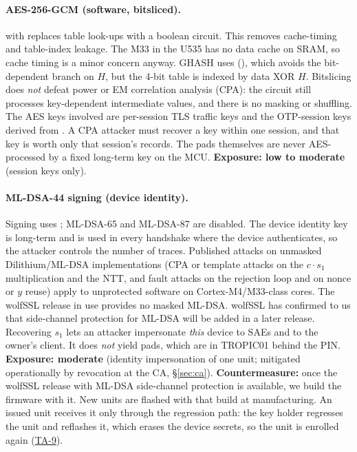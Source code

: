 \documentclass[11pt,a4paper]{article}
\begin{document}
\paragraph{AES-256-GCM (software, bitsliced).}  with  replaces table look-ups with a boolean circuit. This removes cache-timing and table-index leakage. The M33 in the U535 has no data cache on SRAM, so cache timing is a minor concern anyway. GHASH uses  (), which avoids the bit-dependent branch on $H$, but the 4-bit table is indexed by data XOR $H$. Bitslicing does \emph{not} defeat power or EM correlation analysis (CPA): the circuit still processes key-dependent intermediate values, and there is no masking or shuffling. The AES keys involved are per-session TLS traffic keys and the OTP-session keys derived from . A CPA attacker must recover a key within one session, and that key is worth only that session's records. The pads themselves are never AES-processed by a fixed long-term key on the MCU. \textbf{Exposure: low to moderate} (session keys only).

\paragraph{ML-DSA-44 signing (device identity).} Signing uses ; ML-DSA-65 and ML-DSA-87 are disabled. The device identity key is long-term and is used in every handshake where the device authenticates, so the attacker controls the number of traces. Published attacks on unmasked Dilithium/ML-DSA implementations (CPA or template attacks on the $c\cdot s_1$ multiplication and the NTT, and fault attacks on the rejection loop and on nonce or $y$ reuse) apply to unprotected software on Cortex-M4/M33-class cores. The wolfSSL release in use provides no masked ML-DSA. wolfSSL has confirmed to us that side-channel protection for ML-DSA will be added in a later release. Recovering $s_1$ lets an attacker impersonate \emph{this} device to SAEs and to the owner's client. It does \emph{not} yield pads, which are in TROPIC01 behind the PIN. \textbf{Exposure: moderate} (identity impersonation of one unit; mitigated operationally by revocation at the CA, \S\ref{sec:ca}). \textbf{Countermeasure:} once the wolfSSL release with ML-DSA side-channel protection is available, we build the firmware with it. New units are flashed with that build at manufacturing. An issued unit receives it only through the  regression path: the key holder regresses the unit and reflashes it, which erases the device secrets, so the unit is enrolled again (\hyperref[ta:TA-9]{TA-9}).
\end{document}
